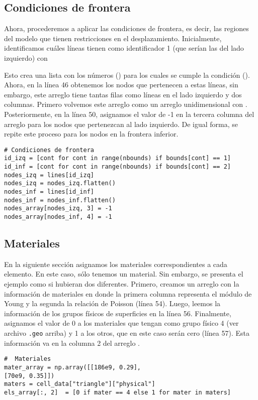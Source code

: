 \subsection{Condiciones de frontera}
Ahora, procederemos a aplicar las condiciones de frontera, es decir, las regiones del modelo que tienen restricciones en el desplazamiento. Inicialmente, identificamos cuáles líneas tienen como identificador 1 (que serían las del lado izquierdo) con


Esto crea una lista con los números () para los cuales se cumple la condición (). Ahora, en la línea 46 obtenemos los nodos que pertenecen a estas líneas, sin embargo, este arreglo tiene tantas filas como líneas en el lado izquierdo y dos columnas. Primero volvemos este arreglo como un arreglo unidimensional con . Posteriormente, en la línea 50, asignamos el valor de -1 en la tercera columna del arreglo  para los nodos que pertenezcan al lado izquierdo. De igual forma, se repite este proceso para los nodos en la frontera inferior.
\begin{verbatim}
# Condiciones de frontera
id_izq = [cont for cont in range(nbounds) if bounds[cont] == 1]
id_inf = [cont for cont in range(nbounds) if bounds[cont] == 2]
nodes_izq = lines[id_izq]
nodes_izq = nodes_izq.flatten()
nodes_inf = lines[id_inf]
nodes_inf = nodes_inf.flatten()
nodes_array[nodes_izq, 3] = -1
nodes_array[nodes_inf, 4] = -1
\end{verbatim}

\subsection{Materiales}
En la siguiente sección asignamos los materiales correspondientes a cada elemento. En este caso, sólo tenemos un material. Sin embargo, se presenta el ejemplo como si hubieran dos diferentes.  Primero, creamos un arreglo con la información de materiales en donde la primera columna representa el módulo de Young y la segunda la relación de Poisson (línea 54). Luego, leemos la información de los grupos físicos de superficies en la línea 56. Finalmente, asignamos el valor de 0 a los materiales que tengan como grupo físico 4 (ver archivo \texttt{.geo} arriba) y 1 a los otros, que en este caso serán cero (línea 57). Esta información va en la columna 2 del arreglo .
\begin{verbatim}
#  Materiales
mater_array = np.array([[186e9, 0.29],
[70e9, 0.35]])
maters = cell_data["triangle"]["physical"]
els_array[:, 2]  = [0 if mater == 4 else 1 for mater in maters]
\end{verbatim}

